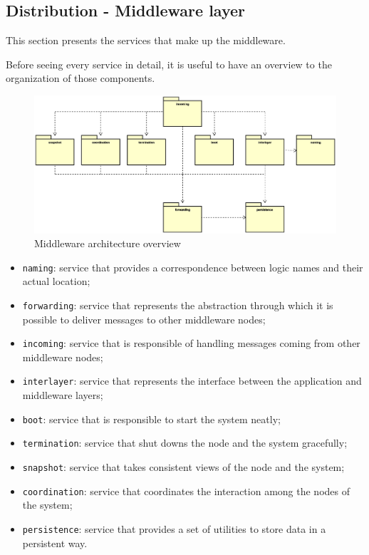\subsection{Distribution - Middleware layer}
This section presents the services that make up the middleware.

Before seeing every service in detail, it is useful to have an overview to the
organization of those components.

\begin{figure}[H]
  \centering
  \includegraphics[width=\columnwidth]{images/solution/mw/overview.eps}
  \caption{Middleware architecture overview}
  \label{fig:mw-arch-over}
\end{figure} %

\begin{itemize}
  \item \texttt{naming}: service that provides a correspondence between logic
    names and their actual location;
  \item \texttt{forwarding}: service that represents the abstraction through
    which it is possible to deliver messages to other middleware nodes;
  \item \texttt{incoming}: service that is responsible of handling messages
    coming from other middleware nodes;
  \item \texttt{interlayer}: service that represents the interface between
    the application and middleware layers;
  \item \texttt{boot}: service that is responsible to start the system neatly;
  \item \texttt{termination}: service that shut downs the node and the system
    gracefully;
  \item \texttt{snapshot}: service that takes consistent views of the node and
    the system;
  \item \texttt{coordination}: service that coordinates the interaction among
    the nodes of the system;
  \item \texttt{persistence}: service that provides a set of utilities to
    store data in a persistent way.
\end{itemize}









